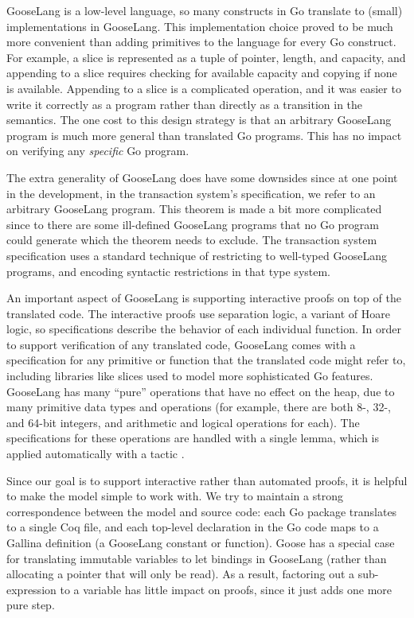 GooseLang is a low-level language, so many constructs in Go translate to
(small) implementations in GooseLang. This implementation choice proved
to be much more convenient than adding primitives to the language for
every Go construct. For example, a slice is represented as a tuple of
pointer, length, and capacity, and appending to a slice requires
checking for available capacity and copying if none is available.
Appending to a slice is a complicated operation, and it was easier to
write it correctly as a program rather than directly as a transition in
the semantics. The one cost to this design strategy is that an arbitrary
GooseLang program is much more general than translated Go programs. This
has no impact on verifying any \emph{specific} Go program.

The extra generality of GooseLang does have some downsides since at one point in
the development, in the transaction system's specification, we refer to an
arbitrary GooseLang program. This theorem is made a bit more complicated since
to there are some ill-defined GooseLang programs that no Go program could
generate which the theorem needs to exclude. The transaction system
specification uses a standard technique of restricting to well-typed GooseLang
programs, and encoding syntactic restrictions in that type system.


An important aspect of GooseLang is supporting interactive proofs on top
of the translated code. The interactive proofs use separation logic, a
variant of Hoare logic, so specifications describe the behavior of each
individual function. In order to support verification of any translated
code, GooseLang comes with a specification for any primitive or function
that the translated code might refer to, including libraries like slices
used to model more sophisticated Go features. GooseLang has many
``pure'' operations that have no effect on the heap, due to many
primitive data types and operations (for example, there are both 8-,
32-, and 64-bit integers, and arithmetic and logical operations for
each). The specifications for these operations are handled with a single
lemma, which is applied automatically with a tactic .

Since our goal is to support interactive rather than automated proofs,
it is helpful to make the model simple to work with. We try to maintain
a strong correspondence between the model and source code: each Go
package translates to a single Coq file, and each top-level declaration
in the Go code maps to a Gallina definition (a GooseLang constant or
function). Goose has a special case for translating immutable variables
to let bindings in GooseLang (rather than allocating a pointer that will
only be read). As a result, factoring out a sub-expression to a variable
has little impact on proofs, since it just adds one more pure step.

